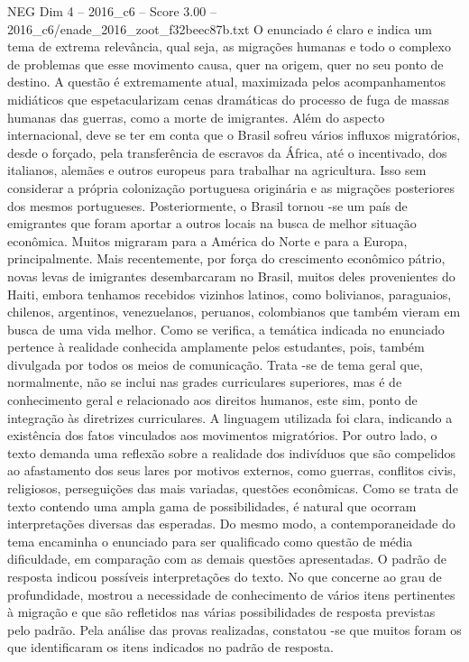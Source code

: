 \begin{textsample}{NEG Dim 4 – 2016\_c6 – Score 3.00 – 2016\_c6/enade\_2016\_zoot\_f32beec87b.txt}
O enunciado é claro e indica um tema de extrema relevância, qual seja, as migrações humanas e todo o complexo de problemas que esse movimento causa, quer na origem, quer no seu ponto de destino.
A questão é extremamente atual, maximizada pelos acompanhamentos midiáticos que espetacularizam cenas dramáticas do processo de fuga de massas humanas das guerras, como a morte de imigrantes.
Além do aspecto internacional, deve se ter em conta que o Brasil sofreu vários influxos migratórios, desde o forçado, pela transferência de escravos da África, até o incentivado, dos italianos, alemães e outros europeus para trabalhar na agricultura.
Isso sem considerar a própria colonização portuguesa originária e as migrações posteriores dos mesmos portugueses.
Posteriormente, o Brasil tornou -se um país de emigrantes que foram aportar a outros locais na busca de melhor situação econômica.
Muitos migraram para a América do Norte e para a Europa, principalmente.
Mais recentemente, por força do crescimento econômico pátrio, novas levas de imigrantes desembarcaram no Brasil, muitos deles provenientes do Haiti, embora tenhamos recebidos vizinhos latinos, como bolivianos, paraguaios, chilenos, argentinos, venezuelanos, peruanos, colombianos que também vieram em busca de uma vida melhor.
Como se verifica, a temática indicada no enunciado pertence à realidade conhecida amplamente pelos estudantes, pois, também divulgada por todos os meios de comunicação.
Trata -se de tema geral que, normalmente, não se inclui nas grades curriculares superiores, mas é de conhecimento geral e relacionado aos direitos humanos, este sim, ponto de integração às diretrizes curriculares.
A linguagem utilizada foi clara, indicando a existência dos fatos vinculados aos movimentos migratórios.
Por outro lado, o texto demanda uma reflexão sobre a realidade dos indivíduos que são compelidos ao afastamento dos seus lares por motivos externos, como guerras, conflitos civis, religiosos, perseguições das mais variadas, questões econômicas.
Como se trata de texto contendo uma ampla gama de possibilidades, é natural que ocorram interpretações diversas das esperadas.
Do mesmo modo, a contemporaneidade do tema encaminha o enunciado para ser qualificado como questão de média dificuldade, em comparação com as demais questões apresentadas.
O padrão de resposta indicou possíveis interpretações do texto.
No que concerne ao grau de profundidade, mostrou a necessidade de conhecimento de vários itens pertinentes à migração e que são refletidos nas várias possibilidades de resposta previstas pelo padrão.
Pela análise das provas realizadas, constatou -se que muitos foram os que identificaram os itens indicados no padrão de resposta.

\end{textsample}
